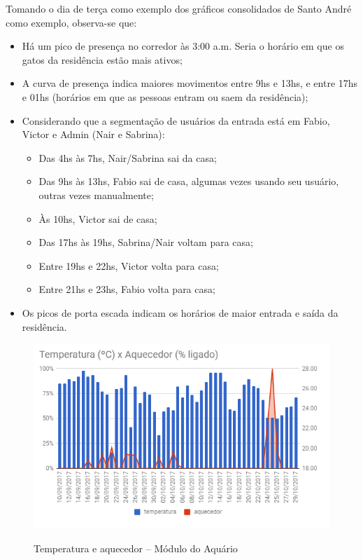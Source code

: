 Tomando o dia de terça como exemplo dos gráficos consolidados de Santo André como exemplo, observa-se que:

\begin{itemize}
	\item Há um pico de presença no corredor às 3:00 a.m. Seria o horário em que os gatos da
	residência estão mais ativos;
	\item A curva de presença indica maiores movimentos entre 9hs e 13hs, e entre 17hs e 01hs (horários em que as pessoas entram ou saem da residência);
	\item Considerando que a segmentação de usuários da entrada está em Fabio, Victor e Admin (Nair e Sabrina):
	\begin{itemize}
		\item Das 4hs às 7hs, Nair/Sabrina sai da casa;
		\item Das 9hs às 13hs, Fabio sai de casa, algumas vezes usando seu usuário, outras vezes manualmente;
		\item Às 10hs, Victor sai de casa;
		\item Das 17hs às 19hs, Sabrina/Nair voltam para casa;
		\item Entre 19hs e 22hs, Victor volta para casa;
		\item Entre 21hs e 23hs, Fabio volta para casa;
	\end{itemize}
	\item Os picos de porta escada indicam os horários de maior entrada e saída da residência.
\end{itemize}

\begin{figure}[H]
	\centering
	\caption{Temperatura e aquecedor -- Módulo do Aquário}
	\includegraphics[width=1.0\textwidth]{TempAquecedorAqua}
	\label{fig:TempAquecedorAqua}
\end{figure}

